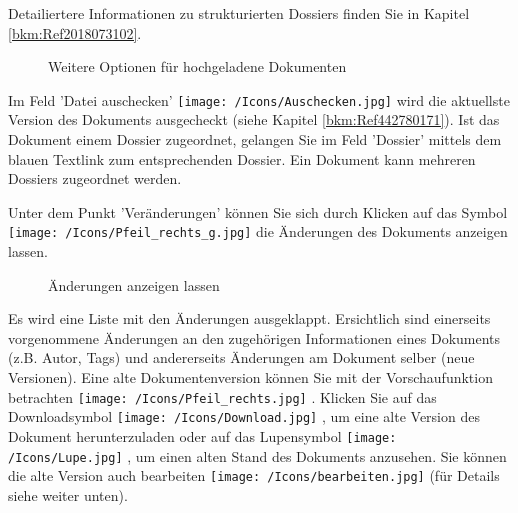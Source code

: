 Detailiertere Informationen zu strukturierten Dossiers finden Sie in Kapitel \ref{bkm:Ref2018073102}.

\vspace{\baselineskip}

\begin{figure}[H]
\caption{Weitere Optionen für hochgeladene Dokumenten}
\end{figure}

Im Feld 'Datei auschecken' \texttt{[image: /Icons/Auschecken.jpg]}  wird die aktuellste Version des Dokuments ausgecheckt (siehe Kapitel \ref{bkm:Ref442780171}). Ist das Dokument einem Dossier zugeordnet, gelangen Sie im Feld 'Dossier' mittels dem blauen Textlink  zum entsprechenden Dossier. Ein Dokument kann mehreren Dossiers zugeordnet werden.

\vspace{\baselineskip}

Unter dem Punkt 'Veränderungen' können Sie sich durch Klicken auf das Symbol \texttt{[image: /Icons/Pfeil\_rechts\_g.jpg]}  die Änderungen des Dokuments anzeigen lassen.

\begin{figure}[H]
\caption{Änderungen anzeigen lassen}
\end{figure}

Es wird eine Liste mit den Änderungen ausgeklappt. Ersichtlich sind einerseits vorgenommene Änderungen an den zugehörigen Informationen eines Dokuments (z.B. Autor, Tags) und andererseits Änderungen am Dokument selber (neue Versionen). Eine alte Dokumentenversion können Sie mit der Vorschaufunktion betrachten \texttt{[image: /Icons/Pfeil\_rechts.jpg]} . Klicken Sie auf das Downloadsymbol \texttt{[image: /Icons/Download.jpg]} , um eine alte Version des Dokument herunterzuladen oder auf das Lupensymbol \texttt{[image: /Icons/Lupe.jpg]} , um einen alten Stand des Dokuments anzusehen. Sie können die alte Version auch bearbeiten \texttt{[image: /Icons/bearbeiten.jpg]}  (für Details siehe weiter unten).\newline

